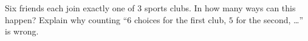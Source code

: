 Six friends each join exactly one of $3$ sports clubs. In how many ways can this happen? Explain why counting ``$6$ choices for the first club, $5$ for the second, \dots'' is wrong.
